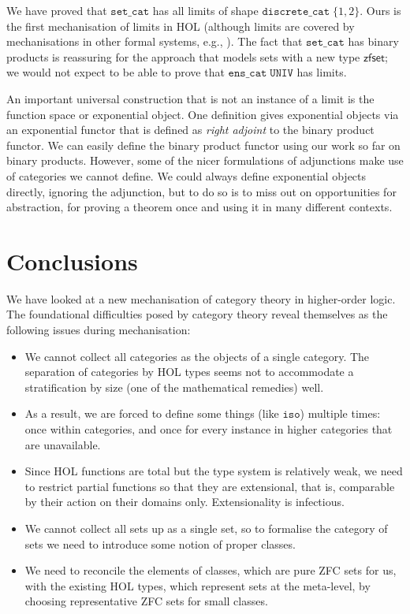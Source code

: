 \documentclass[twoside,titlepage,11pt]{article}
\begin{document}
We have proved that $\mathtt{set\_cat}$ has all limits of shape $\mathtt{discrete\_cat}\;\{1,2\}$.
Ours is the first mechanisation of limits in HOL (although limits are covered by mechanisations in other formal systems, e.g., \cite{DBLP:conf/birthday/HuetS00,Simpson04}).
The fact that $\mathtt{set\_cat}$ has binary products is reassuring for the approach that models sets with a new type $\mathsf{zfset}$; we would not expect to be able to prove that $\mathtt{ens\_cat}\;\mathtt{UNIV}$ has limits.

An important universal construction that is not an instance of a limit is the function space or exponential object.
One definition gives exponential objects via an exponential functor that is defined as \emph{right adjoint} to the binary product functor.
We can easily define the binary product functor using our work so far on binary products.
However, some of the nicer formulations of adjunctions make use of categories we cannot define.
We could always define exponential objects directly, ignoring the adjunction, but to do so is to miss out on opportunities for abstraction, for proving a theorem once and using it in many different contexts.
\section{Conclusions}%
We have looked at a new mechanisation of category theory in higher-order logic.
The foundational difficulties posed by category theory reveal themselves as the following issues during mechanisation:
\begin{itemize}
\item We cannot collect all categories as the objects of a single category.
The separation of categories by HOL types seems not to accommodate a stratification by size (one of the mathematical remedies) well.
\item
As a result, we are forced to define some things (like $\mathtt{iso}$) multiple times: once within categories, and once for every instance in higher categories that are unavailable.
\item
Since HOL functions are total but the type system is relatively weak, we need to restrict partial functions so that they are extensional, that is, comparable by their action on their domains only.
Extensionality is infectious.
\item
We cannot collect all sets up as a single set, so to formalise the category of sets we need to introduce some notion of proper classes.
\item
We need to reconcile the elements of classes, which are pure ZFC sets for us, with the existing HOL types, which represent sets at the meta-level, by choosing representative ZFC sets for small classes.
\end{itemize}
\end{document}
